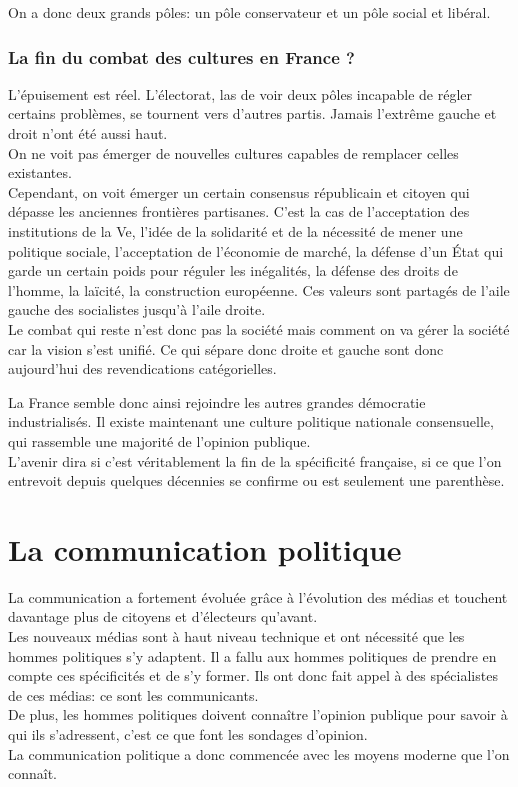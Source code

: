 \documentclass[12pt, a4paper, openany]{book}
\begin{document}
On a donc deux grands pôles: un pôle conservateur et un pôle social et libéral. \\

\subsection{La fin du combat des cultures en France ?}

L'épuisement est réel. L'électorat, las de voir deux pôles incapable de régler certains problèmes, se tournent vers d'autres partis. Jamais l'extrême gauche et droit n'ont été aussi haut. \\
On ne voit pas émerger de nouvelles cultures capables de remplacer celles existantes. \\
Cependant, on voit émerger un certain consensus républicain et citoyen qui dépasse les anciennes frontières partisanes. C'est la cas de l'acceptation des institutions de la Ve, l'idée de la solidarité et de la nécessité de mener une politique sociale, l'acceptation de l'économie de marché, la défense d'un État qui garde un certain poids pour réguler les inégalités, la défense des droits de l'homme, la laïcité, la construction européenne. Ces valeurs sont partagés de l'aile gauche des socialistes jusqu'à l'aile droite. \\
Le combat qui reste n'est donc pas la société mais comment on va gérer la société car la vision s'est unifié. Ce qui sépare donc droite et gauche sont donc aujourd'hui des revendications catégorielles. 


La France semble donc ainsi rejoindre les autres grandes démocratie industrialisés. Il existe maintenant une culture politique nationale consensuelle, qui rassemble une majorité de l'opinion publique. \\
L'avenir dira si c'est véritablement la fin de la spécificité française, si ce que l'on entrevoit depuis quelques décennies se confirme ou est seulement une parenthèse. 


\chapter{La communication politique}

La communication a fortement évoluée grâce à l'évolution des médias et touchent davantage plus de citoyens et d'électeurs qu'avant. \\
Les nouveaux médias sont à haut niveau technique et ont nécessité que les hommes politiques s'y adaptent. Il a fallu aux hommes politiques de prendre en compte ces spécificités et de s'y former. Ils ont donc fait appel à des spécialistes de ces médias: ce sont les communicants. \\
De plus, les hommes politiques doivent connaître l'opinion publique pour savoir à qui ils s'adressent, c'est ce que font les sondages d'opinion. \\
La communication politique a donc commencée avec les moyens moderne que l'on connaît. 
\end{document}
